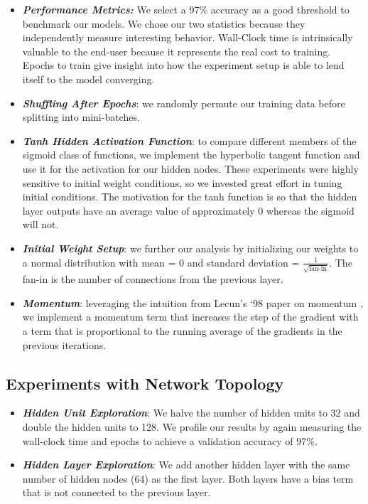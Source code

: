 \documentclass{article} %
\begin{document}
\begin{itemize}
\item \textbf{\textit{Performance Metrics:}} We select a 97\% accuracy as a good threshold to benchmark our models.  We chose our two statistics because they independently measure interesting behavior.  Wall-Clock time is intrinsically valuable to the end-user because it represents the real cost to training.  Epochs to train give insight into how the experiment setup is able to lend itself to the model converging.
\item \textbf{\textit{Shuffling After Epochs}}: we randomly permute our training data before splitting into mini-batches.  
\item \textbf{\textit{Tanh Hidden Activation Function}}: to compare different members of the sigmoid class of functions, we implement the hyperbolic tangent function and use it for the activation for our hidden nodes.  These experiments were highly sensitive to initial weight conditions, so we invested great effort in tuning initial conditions.  The motivation for the tanh function is so that the hidden layer outputs have an average value of approximately 0 whereas the sigmoid will not.  
\item \textbf{\textit{Initial Weight Setup}}: we further our analysis by initializing our weights to a normal distribution with mean = 0 and standard deviation = $\frac{1}{\sqrt{\text{fan-in}}}$.  The fan-in is the number of connections from the previous layer.
\item \textbf{\textit{Momentum}}: leveraging the intuition from Lecun's `98 paper on momentum \cite{LeCun}, we implement a momentum term that increases the step of the gradient with a term that is proportional to the running average of the gradients in the previous iterations.  
\end{itemize}

\subsection*{Experiments with Network Topology}

\begin{itemize}
\item \textbf{\textit{Hidden Unit Exploration}}: We halve the number of hidden units to 32 and double the hidden units to 128.  We profile our results by again measuring the wall-clock time and epochs to achieve a validation accuracy of 97\%.
\item \textbf{\textit{Hidden Layer Exploration}}: We add another hidden layer with the same number of hidden nodes (64) as the first layer.  Both layers have a bias term that is not connected to the previous layer.  
\end{itemize}
\end{document}
